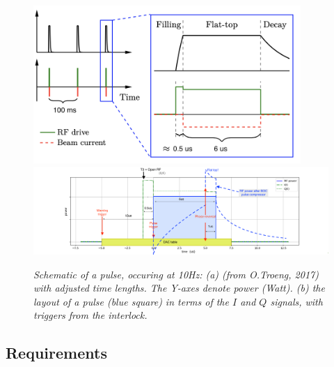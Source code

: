 \documentclass[12pt]{amsart}
\begin{document}
\begin{figure}[htbp] %
   \centering
   \includegraphics[width=4in]{im/pulse.png} 
   \includegraphics[width=5in]{im/pulseP2.png} 
   \caption{\em Schematic of a pulse, occuring at 10Hz: 
   (a) (from O.Troeng, 2017) with adjusted time lengths. The Y-axes denote power (Watt). 
   (b) the layout of a pulse (blue square) in terms of the $I$ and $Q$ signals, with triggers from the interlock.}
   \label{fig:pulse}
\end{figure}


\subsection{Requirements}
\end{document}
